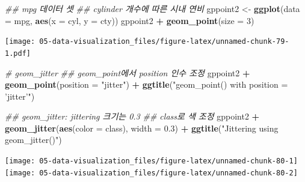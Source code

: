 \documentclass[
  11pt,
]{krantz}
\newenvironment{Shaded}{\begin{snugshade}}{\end{snugshade}}
\newcommand{\CommentTok}[1]{\textcolor[rgb]{0.37,0.37,0.37}{\textit{#1}}}
\newcommand{\DataTypeTok}[1]{\textcolor[rgb]{0.27,0.27,0.27}{#1}}
\newcommand{\DecValTok}[1]{\textcolor[rgb]{0.06,0.06,0.06}{#1}}
\newcommand{\FloatTok}[1]{\textcolor[rgb]{0.06,0.06,0.06}{#1}}
\newcommand{\KeywordTok}[1]{\textcolor[rgb]{0.27,0.27,0.27}{\textbf{#1}}}
\newcommand{\NormalTok}[1]{#1}
\newcommand{\OperatorTok}[1]{\textcolor[rgb]{0.43,0.43,0.43}{\textbf{#1}}}
\newcommand{\StringTok}[1]{\textcolor[rgb]{0.5,0.5,0.5}{#1}}
\begin{document}
\begin{Shaded}
\begin{Highlighting}[]
\CommentTok{## mpg 데이터 셋}
\CommentTok{## cylinder 개수에 따른 시내 연비}
\NormalTok{gppoint2 <-}\StringTok{ }\KeywordTok{ggplot}\NormalTok{(}\DataTypeTok{data =}\NormalTok{ mpg, }
                   \KeywordTok{aes}\NormalTok{(}\DataTypeTok{x =}\NormalTok{ cyl, }\DataTypeTok{y =}\NormalTok{ cty))}
\NormalTok{gppoint2 }\OperatorTok{+}\StringTok{ }\KeywordTok{geom_point}\NormalTok{(}\DataTypeTok{size =} \DecValTok{3}\NormalTok{)}
\end{Highlighting}
\end{Shaded}

\texttt{[image: 05-data-visualization\_files/figure-latex/unnamed-chunk-79-1.pdf]}

\normalsize

\footnotesize

\begin{Shaded}
\begin{Highlighting}[]
\CommentTok{# geom_jitter}
\CommentTok{## geom_point에서 position 인수 조정}
\NormalTok{gppoint2 }\OperatorTok{+}\StringTok{ }
\StringTok{  }\KeywordTok{geom_point}\NormalTok{(}\DataTypeTok{position =} \StringTok{"jitter"}\NormalTok{) }\OperatorTok{+}\StringTok{ }
\StringTok{  }\KeywordTok{ggtitle}\NormalTok{(}\StringTok{"geom_point() with position = 'jitter'"}\NormalTok{)}

\CommentTok{## geom_jitter: jittering 크기는 0.3}
\CommentTok{## class로 색 조정}
\NormalTok{gppoint2 }\OperatorTok{+}\StringTok{ }
\StringTok{  }\KeywordTok{geom_jitter}\NormalTok{(}\KeywordTok{aes}\NormalTok{(}\DataTypeTok{color =}\NormalTok{ class), }
              \DataTypeTok{width =} \FloatTok{0.3}\NormalTok{) }\OperatorTok{+}\StringTok{ }
\StringTok{  }\KeywordTok{ggtitle}\NormalTok{(}\StringTok{"Jittering using geom_jitter()"}\NormalTok{)}
\end{Highlighting}
\end{Shaded}

\texttt{[image: 05-data-visualization\_files/figure-latex/unnamed-chunk-80-1]} \texttt{[image: 05-data-visualization\_files/figure-latex/unnamed-chunk-80-2]}

\normalsize

  

\printindex
\end{document}
